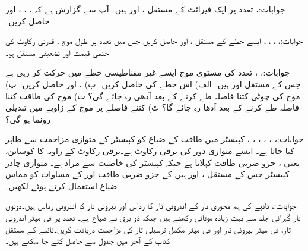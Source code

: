 جوابات:، 
 تعدد پر ایک فیرائٹ کے مستقل ،  اور  ہیں۔ آپ سے گزارش ہے کہ ، ، ،   اور  حاصل کریں۔

جوابات:، ، ، ، 
ایسے خطے کے مستقل ،  اور  حاصل کریں جس میں   تعدد پر طول موج ، قدرتی رکاوٹ کی حتمی قیمت  اور  تضعیفی مستقل  ہو۔

جوابات:،  ،
 تعدد کی مستوی موج ایسے  غیر مقناطیسی خطے میں حرکت کر رہی ہے جس کے مستقل  اور  ہیں۔ الف) اس خطے کی  حاصل کریں۔ ب) ،  اور  حاصل کریں۔ پ) موج کی چوٹی کتنا فاصلہ طے کرنے کے بعد آدھی رہ جائے گی؟  ت) موج کی طاقت کتنا فاصلہ طے کرنے کے بعد آدھا رہ جائے گا؟   ٹ) کتنے فاصلے پر موج کے زاویے میں  تبدیلی رونما ہو گی؟

جوابات:، ، ، ، ، ، 
کپیسٹر  میں طاقت کے ضیاع کو کپیسٹر کے متوازی مزاحمت  سے ظاہر کیا جاتا ہے۔ ایسے متوازی دور کی برقی رکاوٹ  ہے۔برقی رکاوٹ کے زاویہ  کا کوسائن، یعنی ، جزو ضربی طاقت کہلاتا ہے جبکہ کپیسٹر کی خاصیت  سے مراد  ہے۔ متوازی چادر کپیسٹر  جس کے مستقل ،  اور  ہیں کے جزو ضربی طاقت اور  کے مساوات کو مماس ضیاع  استعمال کرتے ہوئے لکھیں۔

جوابات:، 
تانبے کی ہم محوری تار کے اندرونی تار کا رداس  اور  بیرونی تار کا اندرونی رداس  ہیں۔دونوں تار گہرائی جلد  سے بہت زیادہ موٹائی رکھتے ہیں جبکہ ذو برق بے ضیاع ہے۔ تعدد پر فی میٹر اندرونی تار، فی میٹر بیرونی تار اور فی میٹر مکمل ترسیلی تار کی مزاحمت دریافت کریں۔تانبے کے مستقل کتاب کے آخر میں جدول  سے حاصل کئے جا سکتے ہیں۔

